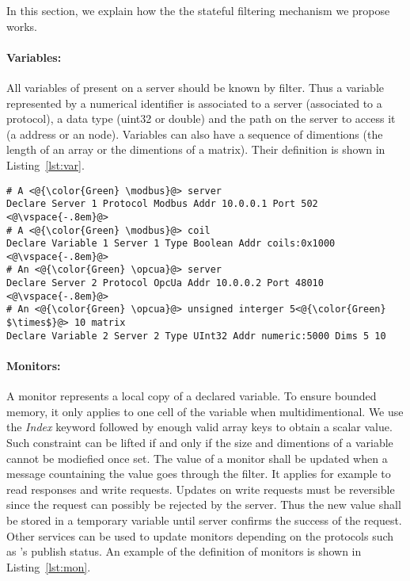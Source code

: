 In this section, we explain how the the stateful filtering mechanism we propose
works.

\paragraph{Variables:} All variables of present on a server should be known by
filter. Thus a variable represented by a numerical identifier is associated to a server
(associated to a protocol), a data type (\eg uint32 or double) and the path on 
the server to access it (\eg a \modbus address or an \opcua node).
Variables can also have a sequence of dimentions (\eg the length of an array or
the dimentions of a matrix).
Their definition is shown in Listing~\ref{lst:var}.

\begin{lstlisting}[label=lst:var,caption=Variable definition example]
# A <@{\color{Green} \modbus}@> server
Declare Server 1 Protocol Modbus Addr 10.0.0.1 Port 502
<@\vspace{-.8em}@>
# A <@{\color{Green} \modbus}@> coil
Declare Variable 1 Server 1 Type Boolean Addr coils:0x1000
<@\vspace{-.8em}@>
# An <@{\color{Green} \opcua}@> server
Declare Server 2 Protocol OpcUa Addr 10.0.0.2 Port 48010
<@\vspace{-.8em}@>
# An <@{\color{Green} \opcua}@> unsigned interger 5<@{\color{Green} $\times$}@> 10 matrix
Declare Variable 2 Server 2 Type UInt32 Addr numeric:5000 Dims 5 10
\end{lstlisting}

\paragraph{Monitors:} A monitor represents a local copy of a declared variable.
To ensure bounded memory, it only applies to one cell of the variable when
multidimentional.
We use the {\em Index} keyword followed by enough valid array keys to obtain a
scalar value.
Such constraint can be lifted if and only if the size and dimentions of a
variable cannot be modiefied once set.
The value of a monitor shall be updated when a message countaining the value
goes through the filter.
It applies for example to read responses and write requests.
Updates on write requests must be reversible since the request can possibly be
rejected by the server.
Thus the new value shall be stored in a temporary variable until server confirms
the success of the request.
Other services can be used to update monitors depending on the protocols such
as \opcua's publish status.
An example of the definition of monitors is shown in Listing~\ref{lst:mon}.

